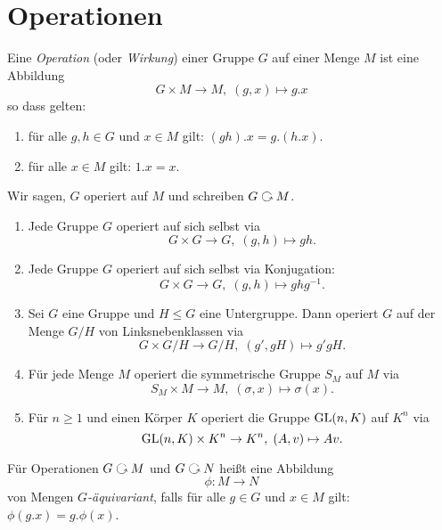 \documentclass{book}
\begin{document}
\section{Operationen}%
\label{sec:operationen}

\begin{defi}
    \label{defi:operation}
    Eine \emph{Operation} (oder \emph{Wirkung}) einer Gruppe $G$ auf einer Menge $M$ ist eine Abbildung 
    \[
        G \times M \to M,\; (g,x) \mapsto g.x 
    \]
    so dass gelten:
    \begin{enumerate}
        \item für alle $g, h \in G$ und $x \in M$ gilt: $(gh).x = g.(h.x)$.
        \item für alle $x \in M$ gilt: $1.x = x$. 
    \end{enumerate}
    Wir sagen, $G$ operiert auf $M$ und schreiben $G \actson M$. 
\end{defi}

\begin{exas}
    \label{exas:groupops}
    \begin{enumerate}
        \item Jede Gruppe $G$ operiert auf sich selbst via
            \[
                G \times G \to G, \; (g,h) \mapsto gh.
            \]
        \item {}Jede Gruppe $G$ operiert auf sich selbst via Konjugation:
            \[
                G \times G \to G, \; (g,h) \mapsto ghg^{-1}.
            \]
        \item {}Sei $G$ eine Gruppe und $H \le G$ eine Untergruppe. Dann operiert
            $G$ auf der Menge $G/H$ von Linksnebenklassen via
            \[
                G \times G/H \to G/H, \; (g', gH) \mapsto g'gH.
            \]
        \item {}Für jede Menge $M$ operiert die symmetrische Gruppe $S_M$ auf $M$ via
            \[
                S_M \times M \to M,\; (\sigma,x) \mapsto \sigma(x).
            \]
        \item Für $n \ge 1$ und einen Körper $K$ operiert die Gruppe $\operatorname{GL}(n,K)$ auf $K^n$ via
            \[
                \operatorname{GL}(n,K) \times K^n \to K^n,\; (A,v) \mapsto Av.
            \]
    \end{enumerate}
\end{exas}

\begin{defi}
    \label{defi:gehom}
    Für Operationen $G \actson M$ und $G \actson N$ heißt eine Abbildung
    \[
        \phi: M \to N
    \]
    von Mengen \emph{$G$-äquivariant}, falls für alle $g \in G$ und $x
    \in M$ gilt: $\phi(g.x) = g. \phi(x)$. 
\end{defi}
\end{document}
